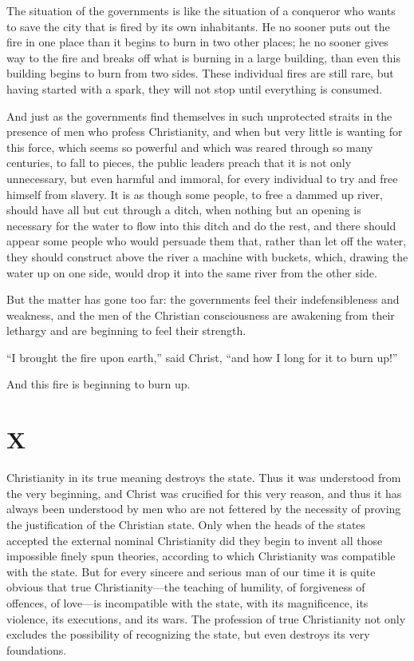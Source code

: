 \documentclass{book}
\begin{document}
The situation of the governments is like the situation of a conqueror who wants to save the city that is fired by its own inhabitants. He no sooner puts out the fire in one place than it begins to burn in two other places; he no sooner gives way to the fire and breaks off what is burning in a large building, than even this building begins to burn from two sides. These individual fires are still rare, but having started with a spark, they will not stop until everything is consumed.

And just as the governments find themselves in such unprotected straits in the presence of men who profess Christianity, and when but very little is wanting for this force, which seems so powerful and which was reared through so many centuries, to fall to pieces, the public leaders preach that it is not only unnecessary, but even harmful and immoral, for every individual to try and free himself from slavery. It is as though some people, to free a dammed up river, should have all but cut through a ditch, when nothing but an opening is necessary for the water to flow into this ditch and do the rest, and there should appear some people who would persuade them that, rather than let off the water, they should construct above the river a machine with buckets, which, drawing the water up on one side, would drop it into the same river from the other side.

But the matter has gone too far: the governments feel their indefensibleness and weakness, and the men of the Christian consciousness are awakening from their lethargy and are beginning to feel their strength.

“I brought the fire upon earth,” said Christ, “and how I long for it to burn up!”

And this fire is beginning to burn up.

\chapter*{X}
\label{chapter-10}
Christianity in its true meaning destroys the state. Thus it was understood from the very beginning, and Christ was crucified for this very reason, and thus it has always been understood by men who are not fettered by the necessity of proving the justification of the Christian state. Only when the heads of the states accepted the external nominal Christianity did they begin to invent all those impossible finely spun theories, according to which Christianity was compatible with the state. But for every sincere and serious man of our time it is quite obvious that true Christianity—the teaching of humility, of forgiveness of offences, of love—is incompatible with the state, with its magnificence, its violence, its executions, and its wars. The profession of true Christianity not only excludes the possibility of recognizing the state, but even destroys its very foundations.
\end{document}
